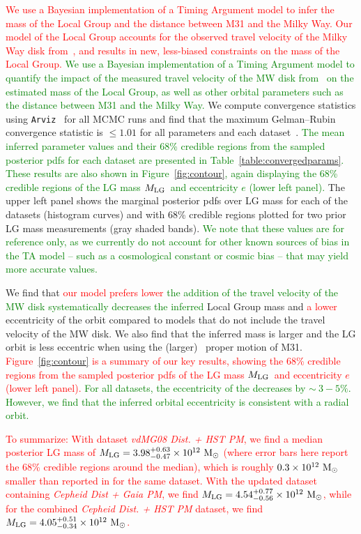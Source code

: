 \documentclass[twocolumn]{aastex631}
\newcommand{\remove}[1]{\textcolor{red}{#1}}
\newcommand{\add}[1]{\textcolor{green}{#1}}
\newcommand{\mlg}{\ensuremath{M_{\rm LG}}}
\begin{document}
\remove{We use a Bayesian implementation of a Timing Argument model to infer the mass of
the Local Group and the distance between M31 and the Milky Way.}
\remove{Our model of the Local Group accounts for the observed travel velocity of
the Milky Way disk from~\cite{Petersen2021}, and results in new,
less-biased constraints on the mass of the Local Group.}
\add{We use a Bayesian implementation of a Timing Argument model to quantify the
impact of the measured travel velocity of the MW disk from~\cite{Petersen2021}
on the estimated mass of the Local Group, as well as other orbital parameters
such as the distance between M31 and the Milky Way.}
We compute convergence statistics using \texttt{Arviz}~\citep{arviz} for all
MCMC runs and find that the maximum Gelman--Rubin convergence statistic is
$\leq1.01$ for all parameters and each dataset~\citep{GelmanRubin1992}.
\add{The mean inferred parameter values and their 68\% credible regions from the
sampled posterior pdfs for each dataset are presented in
Table~\ref{table:convergedparams}.
These results are also shown in
Figure~\ref{fig:contour}, again displaying the 68\% credible regions of the LG
mass \mlg\ and eccentricity $e$ (lower left panel).}
The upper left panel shows the marginal posterior pdfs over LG mass for each of
the datasets (histogram curves) and with 68\% credible regions plotted for two
prior LG mass measurements (gray shaded bands).
\add{We note that these values are for reference only, as we currently do not account
for other known sources of bias in the TA model -- such as a cosmological constant or
cosmic bias -- that may yield more accurate values.}

We find that \remove{our model prefers lower}
\add{the addition of the travel velocity of the MW disk systematically decreases
the inferred} Local Group mass and \remove{a lower} eccentricity of the
orbit compared to models that do not include the travel velocity of the MW disk.
We also find that the inferred mass is larger and the LG orbit is less eccentric
when using the (larger) \gaia\ proper motion of M31.
\remove{Figure~\ref{fig:contour} is a summary of our key results, showing the 68\%
credible regions from the sampled posterior pdfs of the LG mass \mlg\ and
eccentricity $e$ (lower left panel).}
\add{For all datasets, the eccentricity of the decreases by $\sim~3-5\%$.
However, we find that the inferred orbital eccentricity is consistent with a
radial orbit.}

\remove{To summarize: With dataset \textit{vdMG08 Dist. + HST PM}, we find a
median posterior LG mass of $\mlg = 3.98 ^{+0.63}_{-0.47}\times10^{12}~\Msun$
(where error
bars here report the 68\% credible regions around the median), which is
roughly $0.3\times 10^{12}~\mathrm{M}_\odot$ smaller than reported in \cite{vdm2012} for
the same dataset.
With the updated dataset containing \textit{Cepheid Dist + Gaia PM}, we find
$\mlg = 4.54 ^{+0.77}_{-0.56}\times10^{12}~\Msun$, while for the combined
 \textit{Cepheid Dist. + HST PM} dataset, we find
 $\mlg = 4.05^{+0.51}_{-0.34}\times 10^{12}~\Msun$.}
\end{document}

